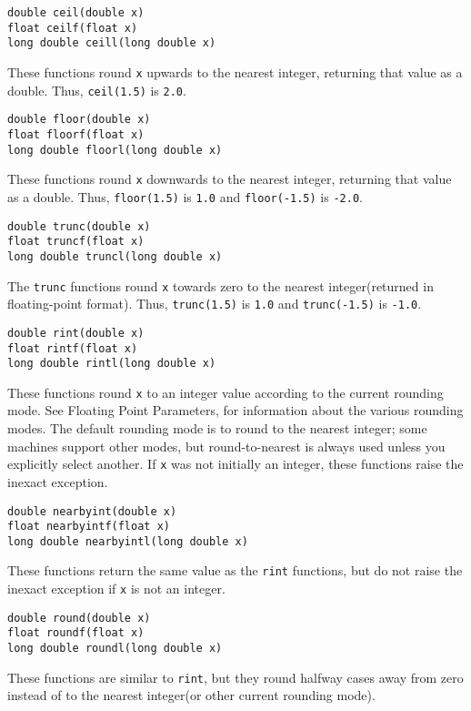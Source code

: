 \documentclass[12pt, titlepage]{article}
\renewcommand{\tt}[1]{\texttt{\small #1}}
\begin{document}
\begin{verbatim}
double ceil(double x)
float ceilf(float x)
long double ceill(long double x)
\end{verbatim}
These functions round \tt{x} upwards to the nearest integer, returning that value as a double. Thus, \tt{ceil(1.5)} is \tt{2.0}.

\begin{verbatim}
double floor(double x)
float floorf(float x)
long double floorl(long double x)
\end{verbatim}
These functions round \tt{x} downwards to the nearest integer, returning that value as a double. Thus, \tt{floor(1.5)} is \tt{1.0} and \tt{floor(-1.5)} is \tt{-2.0}.

\begin{verbatim}
double trunc(double x)
float truncf(float x)
long double truncl(long double x)
\end{verbatim}
The \tt{trunc} functions round \tt{x} towards zero to the nearest integer(returned in floating-point format). Thus, \tt{trunc(1.5)} is \tt{1.0} and \tt{trunc(-1.5)} is \tt{-1.0}.

\begin{verbatim}
double rint(double x)
float rintf(float x)
long double rintl(long double x)
\end{verbatim}
These functions round \tt{x} to an integer value according to the current rounding mode. See Floating Point Parameters, for information about the various rounding modes. The default rounding mode is to round to the nearest integer; some machines support other modes, but round-to-nearest is always used unless you explicitly select another. If \tt{x} was not initially an integer, these functions raise the inexact exception.

\begin{verbatim}
double nearbyint(double x)
float nearbyintf(float x)
long double nearbyintl(long double x)
\end{verbatim}
These functions return the same value as the \tt{rint} functions, but do not raise the inexact exception if \tt{x} is not an integer.

\begin{verbatim}
double round(double x)
float roundf(float x)
long double roundl(long double x)
\end{verbatim}
These functions are similar to \tt{rint}, but they round halfway cases away from zero instead of to the nearest integer(or other current rounding mode).
\end{document}
